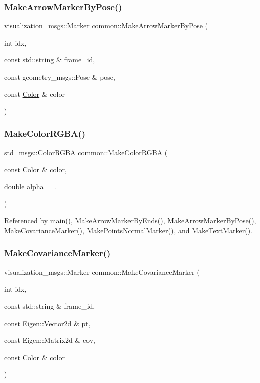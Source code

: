\subsubsection{\texorpdfstring{Make\+Arrow\+Marker\+By\+Pose()}{MakeArrowMarkerByPose()}}
{\footnotesize\ttfamily visualization\+\_\+msgs\+::\+Marker common\+::\+Make\+Arrow\+Marker\+By\+Pose (\begin{DoxyParamCaption}\item[{int}]{idx,  }\item[{const std\+::string \&}]{frame\+\_\+id,  }\item[{const geometry\+\_\+msgs\+::\+Pose \&}]{pose,  }\item[{const \hyperlink{namespacecommon_a325f61d2a1dcd20782fbb1421c0c3631}{Color} \&}]{color }\end{DoxyParamCaption})}

\mbox{\label{namespacecommon_a1536d9969a0d06faf584e616bd12ca08}} 
\subsubsection{\texorpdfstring{Make\+Color\+R\+G\+B\+A()}{MakeColorRGBA()}}
{\footnotesize\ttfamily std\+\_\+msgs\+::\+Color\+R\+G\+BA common\+::\+Make\+Color\+R\+G\+BA (\begin{DoxyParamCaption}\item[{const \hyperlink{namespacecommon_a325f61d2a1dcd20782fbb1421c0c3631}{Color} \&}]{color,  }\item[{double}]{alpha = {.} }\end{DoxyParamCaption})}



Referenced by main(), Make\+Arrow\+Marker\+By\+Ends(), Make\+Arrow\+Marker\+By\+Pose(), Make\+Covariance\+Marker(), Make\+Points\+Normal\+Marker(), and Make\+Text\+Marker().

\mbox{\label{namespacecommon_a61576f8134edf708a3d72a842db21413}} 
\subsubsection{\texorpdfstring{Make\+Covariance\+Marker()}{MakeCovarianceMarker()}}
{\footnotesize\ttfamily visualization\+\_\+msgs\+::\+Marker common\+::\+Make\+Covariance\+Marker (\begin{DoxyParamCaption}\item[{int}]{idx,  }\item[{const std\+::string \&}]{frame\+\_\+id,  }\item[{const Eigen\+::\+Vector2d \&}]{pt,  }\item[{const Eigen\+::\+Matrix2d \&}]{cov,  }\item[{const \hyperlink{namespacecommon_a325f61d2a1dcd20782fbb1421c0c3631}{Color} \&}]{color }\end{DoxyParamCaption})}

